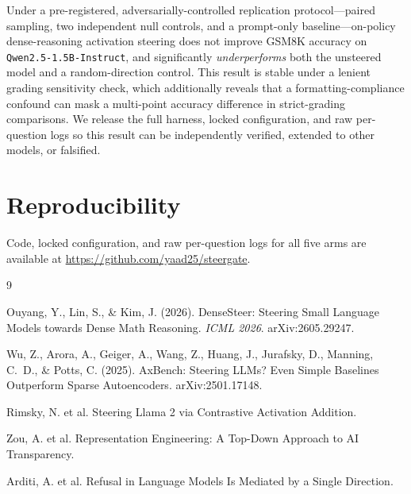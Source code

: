 \documentclass[11pt]{article}
\begin{document}
Under a pre-registered, adversarially-controlled replication protocol---paired sampling, two
independent null controls, and a prompt-only baseline---on-policy dense-reasoning activation
steering does not improve GSM8K accuracy on \texttt{Qwen2.5-1.5B-Instruct}, and significantly
\emph{underperforms} both the unsteered model and a random-direction control. This result is
stable under a lenient grading sensitivity check, which additionally reveals that a
formatting-compliance confound can mask a multi-point accuracy difference in strict-grading
comparisons. We release the full harness, locked configuration, and raw per-question logs so
this result can be independently verified, extended to other models, or falsified.

\section*{Reproducibility}
Code, locked configuration, and raw per-question logs for all five arms are available at
\url{https://github.com/yaad25/steergate}.

\begin{thebibliography}{9}

Ouyang, Y., Lin, S., \& Kim, J. (2026). DenseSteer: Steering Small Language Models towards Dense
Math Reasoning. \emph{ICML 2026}. arXiv:2605.29247.

Wu, Z., Arora, A., Geiger, A., Wang, Z., Huang, J., Jurafsky, D., Manning, C.~D., \& Potts, C.
(2025). AxBench: Steering LLMs? Even Simple Baselines Outperform Sparse Autoencoders.
arXiv:2501.17148.

Rimsky, N. et al. Steering Llama 2 via Contrastive Activation Addition.

Zou, A. et al. Representation Engineering: A Top-Down Approach to AI Transparency.

Arditi, A. et al. Refusal in Language Models Is Mediated by a Single Direction.

\end{thebibliography}
\end{document}
